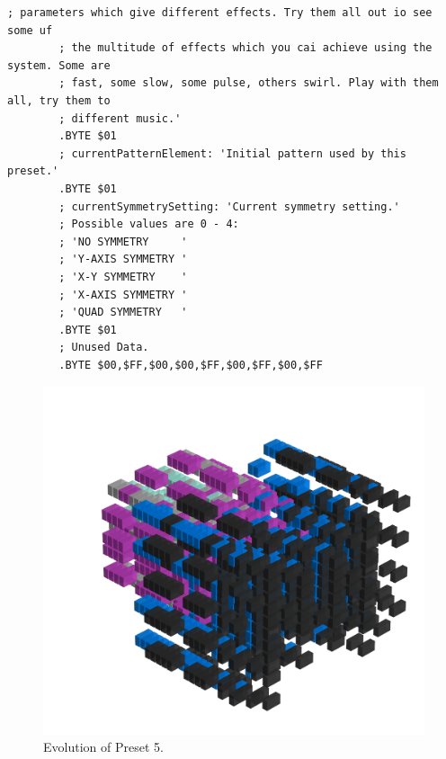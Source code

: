 \begin{lstlisting}[basicstyle=\tiny,caption=Source code for Preset 4.]
        ; parameters which give different effects. Try them all out io see some uf
        ; the multitude of effects which you cai achieve using the system. Some are
        ; fast, some slow, some pulse, others swirl. Play with them all, try them to
        ; different music.'
        .BYTE $01
        ; currentPatternElement: 'Initial pattern used by this preset.'
        .BYTE $01
        ; currentSymmetrySetting: 'Current symmetry setting.'
        ; Possible values are 0 - 4:
        ; 'NO SYMMETRY     '
        ; 'Y-AXIS SYMMETRY '
        ; 'X-Y SYMMETRY    '
        ; 'X-AXIS SYMMETRY '
        ; 'QUAD SYMMETRY   '
        .BYTE $01
        ; Unused Data.
        .BYTE $00,$FF,$00,$00,$FF,$00,$FF,$00,$FF
\end{lstlisting}


\clearpage                                                                 
\begin{figure}[H]                                                          
    \centering                                                             
    \begin{adjustbox}{width=14cm,center}                                   
      \includegraphics[width=14cm]{src/presets/pattern5-45.png}%
    \end{adjustbox}                                                        
\caption{Evolution of Preset 5.}                                           
\end{figure}                                                               
\clearpage                                                                 
                                                                           
